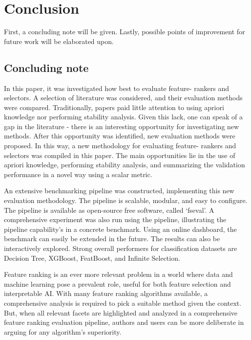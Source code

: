 \documentclass[../main.tex]{subfiles}
\begin{document}
\section{Conclusion}\label{section:conclusion}
First, a concluding note will be given. Lastly, possible points of improvement for future work will be elaborated upon.

\subsection{Concluding note}
In this paper, it was investigated how best to evaluate feature- rankers and selectors. A selection of literature was considered, and their evaluation methods were compared. Traditionally, papers paid little attention to using \gls{apriori} knowledge nor performing stability analysis. Given this lack, one can speak of a gap in the literature - there is an interesting opportunity for investigating new methods.
After this opportunity was identified, new evaluation methods were proposed. In this way, a new methodology for evaluating feature- rankers and selectors was compiled in this paper. The main opportunities lie in the use of \gls{apriori} knowledge, performing stability analysis, and summarizing the validation performance in a novel way using a scalar metric.

An extensive benchmarking pipeline was constructed, implementing this new evaluation methodology. The pipeline is scalable, modular, and easy to configure. The pipeline is available as open-source free software, called `fseval'. A comprehensive experiment was also run using the pipeline, illustrating the pipeline capability's in a concrete benchmark. Using an online dashboard, the benchmark can easily be extended in the future. The results can also be interactively explored. Strong overall performers for classification datasets are Decision Tree, XGBoost, FeatBoost, and Infinite Selection. 

Feature ranking is an ever more relevant problem in a world where data and machine learning pose a prevalent role, useful for both feature selection and interpretable AI. With many feature ranking algorithms available, a comprehensive analysis is required to pick a suitable method given the context. But, when all relevant facets are highlighted and analyzed in a comprehensive feature ranking evaluation pipeline, authors and users can be more deliberate in arguing for any algorithm’s superiority.
\end{document}
